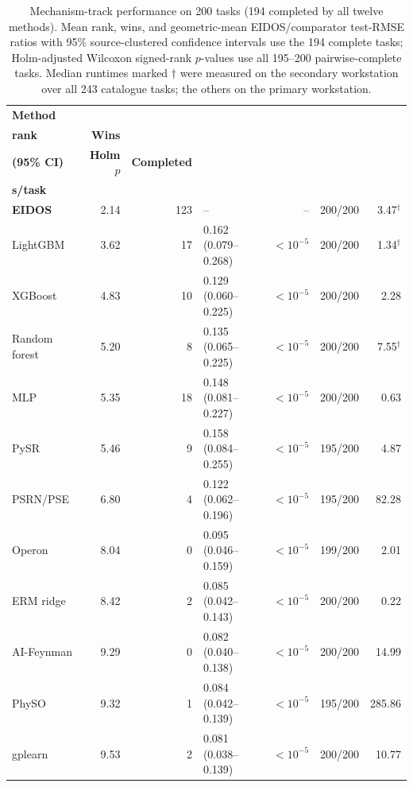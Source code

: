 \begin{table}[t]
\def\baselinestretch{1}\selectfont
\caption{Mechanism-track performance on 200 tasks (194 completed by all twelve methods). Mean rank, wins, and geometric-mean EIDOS/comparator test-RMSE ratios with 95\% source-clustered confidence intervals use the 194 complete tasks; Holm-adjusted Wilcoxon signed-rank \(p\)-values use all 195--200 pairwise-complete tasks. Median runtimes marked \(\dagger\) were measured on the secondary workstation over all 243 catalogue tasks; the others on the primary workstation.}\label{tab:predictive}
\centering
\scriptsize
\setlength{\tabcolsep}{4.0pt}
\renewcommand{\arraystretch}{1.06}
\begin{tabularx}{\textwidth}{@{}>{\raggedright\arraybackslash}Xrrlrrr@{}}
\toprule
\textbf{Method} & \shortstack{\textbf{Mean}\\\textbf{rank}} & \textbf{Wins} & \shortstack{\textbf{EIDOS/method}\\\textbf{(95\% CI)}} & \textbf{Holm \(p\)} & \textbf{Completed} & \shortstack{\textbf{Median}\\\textbf{s/task}} \\
\midrule
\textbf{EIDOS} & 2.14 & 123 & -- & -- & 200/200 & 3.47\(^\dagger\) \\
LightGBM & 3.62 & 17 & 0.162 (0.079--0.268) & \(<10^{-5}\) & 200/200 & 1.34\(^\dagger\) \\
XGBoost & 4.83 & 10 & 0.129 (0.060--0.225) & \(<10^{-5}\) & 200/200 & 2.28 \\
Random forest & 5.20 & 8 & 0.135 (0.065--0.225) & \(<10^{-5}\) & 200/200 & 7.55\(^\dagger\) \\
MLP & 5.35 & 18 & 0.148 (0.081--0.227) & \(<10^{-5}\) & 200/200 & 0.63 \\
PySR & 5.46 & 9 & 0.158 (0.084--0.255) & \(<10^{-5}\) & 195/200 & 4.87 \\
PSRN/PSE & 6.80 & 4 & 0.122 (0.062--0.196) & \(<10^{-5}\) & 195/200 & 82.28 \\
Operon & 8.04 & 0 & 0.095 (0.046--0.159) & \(<10^{-5}\) & 199/200 & 2.01 \\
ERM ridge & 8.42 & 2 & 0.085 (0.042--0.143) & \(<10^{-5}\) & 200/200 & 0.22 \\
AI-Feynman & 9.29 & 0 & 0.082 (0.040--0.138) & \(<10^{-5}\) & 200/200 & 14.99 \\
PhySO & 9.32 & 1 & 0.084 (0.042--0.139) & \(<10^{-5}\) & 195/200 & 285.86 \\
gplearn & 9.53 & 2 & 0.081 (0.038--0.139) & \(<10^{-5}\) & 200/200 & 10.77 \\
\bottomrule
\end{tabularx}
\end{table}

